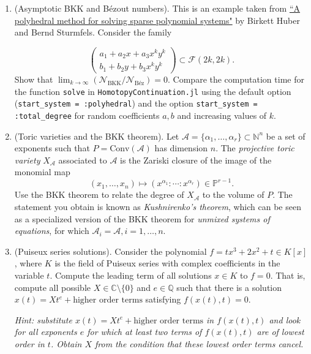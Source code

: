\documentclass[11pt,reqno]{amsart}
\theoremstyle{definition}
\theoremstyle{remark}
\numberwithin{equation}{section}
\begin{document}
\begin{enumerate}
\item (Asymptotic BKK and B\'ezout numbers). 
This is an example taken from \href{https://www.jstor.org/stable/2153370?seq=1#metadata_info_tab_contents}{ ``A polyhedral method for solving sparse polynomial systems"} by Birkett Huber and Bernd Sturmfels. Consider the family

$$\begin{pmatrix}
a_1 +  a_2 x + a_3 x^ky^k \\
b_1 + b_2 y + b_3 x^ky^k
\end{pmatrix} \subset \mathcal{F}(2k,2k).$$
Show that $\lim_{k \rightarrow \infty} ( \mathcal{N}_{\text{BKK}} / \mathcal{N}_{\text{Béz}} ) = 0$. Compare the computation time for the function \texttt{solve} in \texttt{HomotopyContinuation.jl} using the default option (\texttt{start\_system = :polyhedral}) and the option \texttt{start\_system = :total\_degree} for random coefficients $a, b$ and increasing values of $k$.

 \item (Toric varieties and the BKK theorem).
Let $\mathcal{A} = \{ \alpha_1, \ldots, \alpha_r \} \subset \mathbb{N}^n$ be a set of exponents such that $P = \text{Conv}(\mathcal{A})$ has dimension $n$. The \emph{projective toric variety} $X_\mathcal{A}$ associated to $\mathcal{A}$ is the Zariski closure of the image of the monomial map
$$ (x_1, \ldots, x_n) \mapsto (x^{\alpha_1} : \cdots : x^{\alpha_r}) \in \mathbb{P}^{r-1}.$$
Use the BKK theorem to relate the degree of $X_\mathcal{A}$ to the volume of $P$. The statement you obtain is known as \emph{Kushnirenko's theorem}, which can be seen as a specialized version of the BKK theorem for \emph{unmixed systems of equations}, for which $\mathcal{A}_i = \mathcal{A}, i = 1, \ldots, n$.

\item (Puiseux series solutions).
Consider the polynomial $f = tx^3 + 2x^2 + t \in K[x]$, where $K$ is the field of Puiseux series with complex coefficients in the variable $t$. Compute the leading term of all solutions $x \in K$ to $f = 0$. That is, compute all possible $X \in \mathbb{C} \setminus \{0\}$ and $e \in \mathbb{Q}$ such that there is a solution $x(t) = X t^e + \text{higher order terms}$ satisfying $f(x(t),t) = 0$.

\textit{Hint: substitute $x(t) = X t^e + \text{higher order terms}$ in $f(x(t),t)$ and look for all exponents $e$ for which at least two terms of $f(x(t),t)$ are of lowest order in $t$. Obtain $X$ from the condition that these lowest order terms cancel. }


\end{enumerate}
\end{document}
